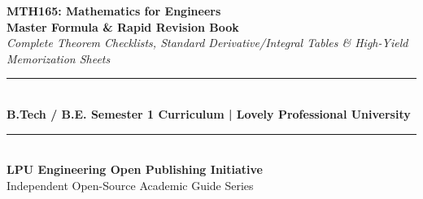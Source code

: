 \begin{titlepage}
\centering
\vspace*{1.5cm}
{\Huge \textbf{\color{LPUNavy}MTH165: Mathematics for Engineers}}\\[0.5cm]
{\LARGE \textbf{\color{LPUOrange}Master Formula \& Rapid Revision Book}}\\[0.3cm]
{\large \textit{Complete Theorem Checklists, Standard Derivative/Integral Tables \& High-Yield Memorization Sheets}}\\[2cm]

\rule{\linewidth}{1.5pt}\\[0.5cm]
{\large \textbf{B.Tech / B.E. Semester 1 Curriculum | Lovely Professional University}}\\[0.5cm]
\rule{\linewidth}{1.5pt}\\[2.5cm]

\vfill
{\large \textbf{LPU Engineering Open Publishing Initiative}}\\[0.2cm]
{\small Independent Open-Source Academic Guide Series}
\end{titlepage}
\newpage
